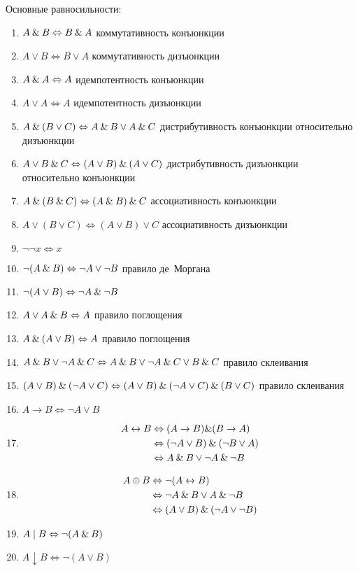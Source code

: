\documentclass[main]{subfiles}
\begin{document}
Основные равносильности:
\begin{enumerate}

    \item $A\mathbin{\&} B \Leftrightarrow B\mathbin{\&} A$ коммутативность конъюнкции
    \item $A\lor B \Leftrightarrow B\lor A$ коммутативность дизъюнкции
    \item $A\mathbin{\&} A \Leftrightarrow A$ идемпотентность конъюнкции
    \item $A\lor A \Leftrightarrow  A$ идемпотентность дизъюнкции
    \item $A\mathbin{\&}(B\lor C) \Leftrightarrow  A\mathbin{\&} B \lor A\mathbin{\&} C$ дистрибутивность конъюнкции относительно дизъюнкции
    \item $A\lor B\mathbin{\&} C  \Leftrightarrow (A\lor B)\mathbin{\&} (A\lor C)$ дистрибутивность дизъюнкции относительно конъюнкции
    \item $A\mathbin{\&} (B\mathbin{\&} C) \Leftrightarrow (A\mathbin{\&} B)\mathbin{\&} C$ ассоциативность конъюнкции
    \item $A\lor (B\lor C) \Leftrightarrow  (A\lor B)\lor C$ ассоциативность дизъюнкции
    \item $\lnot\lnot x \Leftrightarrow x$
    \item $\lnot(A\mathbin{\&} B) \Leftrightarrow \lnot A \lor \lnot B$ правило де~Моргана
    \item $\lnot(A\lor B) \Leftrightarrow  \lnot A \mathbin{\&} \lnot B$
    \item $A\lor A \mathbin{\&} B \Leftrightarrow  A$ правило поглощения
    \item $A\mathbin{\&}(A\lor B) \Leftrightarrow  A$ правило поглощения
    \item $A\mathbin{\&} B \lor \lnot A\mathbin{\&} C \Leftrightarrow  A\mathbin{\&} B \lor \lnot A \mathbin{\&} C \lor B\mathbin{\&} C $ правило склеивания
    \item $(A\lor B) \mathbin{\&} (\lnot A \lor C) \Leftrightarrow  (A\lor B) \mathbin{\&} (\lnot A \lor C) \mathbin{\&} (B\lor C)$ правило склеивания
    \item $A\to B \Leftrightarrow \lnot A \lor B$
    \item
          \begin{align*}
              A\leftrightarrow B & \Leftrightarrow (A\to B) \& (B\to A)                  \\
                                 & \Leftrightarrow (\lnot A\lor B) \mathbin{\&} (\lnot B \lor A) \\
                                 & \Leftrightarrow A\mathbin{\&} B \lor \lnot A \mathbin{\&} \lnot B
          \end{align*}
    \item
          \begin{align*}
              A\oplus B & \Leftrightarrow \lnot(A \leftrightarrow B)            \\
                        & \Leftrightarrow \lnot A\mathbin{\&} B \lor A \mathbin{\&} \lnot B     \\
                        & \Leftrightarrow (A\lor B) \mathbin{\&} (\lnot A \lor \lnot B)
          \end{align*}
    \item $A \mid B \Leftrightarrow  \lnot(A \mathbin{\&} B)$
    \item $A \downarrow B \Leftrightarrow \lnot (A\lor B)$
\end{enumerate}
\end{document}
